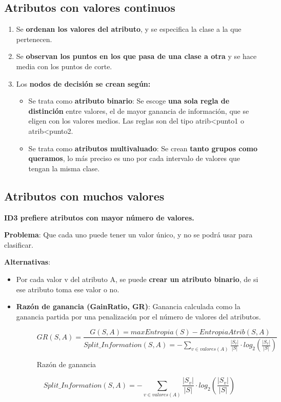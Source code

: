 \documentclass[12pt, twoside, openright]{report} %
\begin{document}
\subsection{Atributos con valores
	continuos}
\begin{enumerate}
	\def\labelenumi{\arabic{enumi}.}
	\item Se \textbf{ordenan los valores del atributo}, y se especifica la clase
	      a la que pertenecen.
	\item Se \textbf{observan los puntos en los que pasa de una clase a otra} y
	      se hace media con los puntos de corte.
	\item Los \textbf{nodos de decisión se crean según:}

	      \begin{itemize}
		      \item Se trata como \textbf{atributo binario}: Se escoge \textbf{una sola
			            regla de distinción} entre valores, el de mayor ganancia de
		            información, que se eligen con los valores medios. Las reglas son del
		            tipo atrib\textless punto1 o atrib\textless punto2.
		      \item Se trata como \textbf{atributos multivaluado}: Se crean
		            \textbf{tanto grupos como queramos}, lo más preciso es uno por cada
		            intervalo de valores que tengan la misma clase.
	      \end{itemize}
\end{enumerate}

\subsection{Atributos con muchos
	valores}

\textbf{ID3 prefiere atributos con mayor número de valores.}

\textbf{Problema}: Que cada uno puede tener un valor único, y no se podrá usar para clasificar.

\textbf{Alternativas}:

\begin{itemize}
	\item Por cada valor v del atributo A, se puede \textbf{crear un atributo binario}, de si ese atributo toma ese valor o no.
	      \pagebreak
	\item \textbf{Razón de ganancia (GainRatio, GR)}: Ganancia calculada como la ganancia partida por una penalización por el número de valores del
	      atributos.
	      \begin{figure}[H]
		      $$
			      GR(S, A)= \frac {G(S, A)=max Entropia(S)-EntropiaAtrib(S, A)}{\textit{Split\_Information}(S, A)=-\sum_{v\in valores(A)} \frac {|S_v|}{|S|} \cdot log_2(\frac {|S_v|}{|S|})}
		      $$
		      \captionsetup{justification=centering}
		      \caption{Razón de ganancia}
	      \end{figure}
	      $$
		      \textit{Split\_Information}(S, A)=-\sum_{v\in valores(A)} \frac {|S_v|}{|S|} \cdot log_2(\frac {|S_v|}{|S|})
	      $$
\end{itemize}
\end{document}
